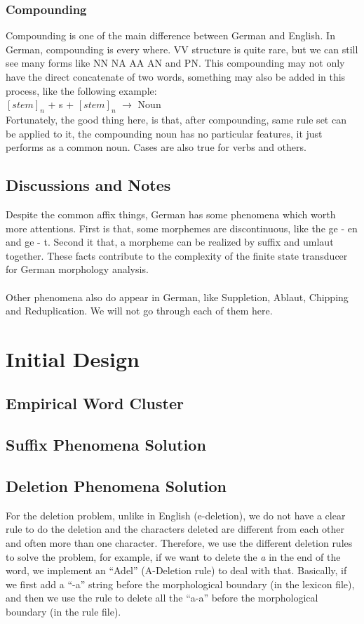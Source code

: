 \documentclass[11pt,letterpaper]{article}
\begin{document}
\subsubsection{Compounding}
Compounding is one of the main difference between German and English. In German, compounding is every where. VV structure is quite rare, but we can still see many forms like NN NA AA AN and PN. This compounding may not only have the direct concatenate of two words, something may also be added in this process, like the following example:\\
$[stem]_n$ + s + $[stem]_n$ $\rightarrow$ Noun\\
Fortunately, the good thing here, is that, after compounding, same rule set can be applied to it, the compounding noun has no particular features, it just performs as a common noun. Cases are also true for verbs and others.

\subsection{Discussions and Notes}
Despite the common affix things, German has some phenomena which worth more attentions. First is that, some morphemes are discontinuous, like the ge - en and ge - t. Second it that, a morpheme can be realized by suffix and umlaut together. These facts contribute to the complexity of the finite state transducer for German morphology analysis.\\\\
Other phenomena also do appear in German, like Suppletion, Ablaut, Chipping and Reduplication. We will not go through each of them here.

\section{Initial Design}

\subsection{Empirical Word Cluster}

\subsection{Suffix Phenomena Solution}

\subsection{Deletion Phenomena Solution}
For the deletion problem, unlike in English (e-deletion), we do not have a clear rule to do the deletion and the characters deleted are different from each other and often more than one character. Therefore, we use the different deletion rules to solve the problem, for example, if we want to delete the \textit{a} in the end of the word, we implement an ``Adel'' (A-Deletion rule) to deal with that. Basically, if we first add a ``-a'' string before the morphological boundary (in the lexicon file), and then we use the rule to delete all the ``a-a'' before the morphological boundary (in the rule file).
\end{document}
